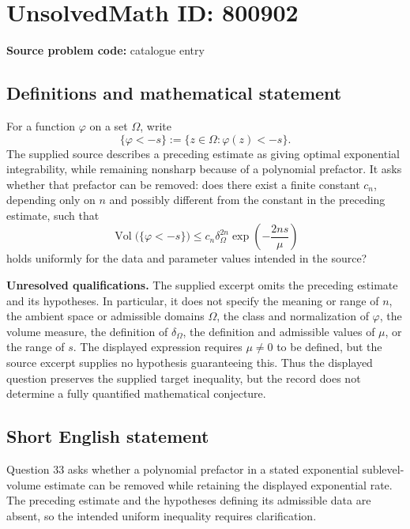 \documentclass[11pt]{article}
\begin{document}
\section*{UnsolvedMath ID: 800902}
\textbf{Source problem code:} catalogue entry
\subsection{Definitions and mathematical statement}
For a function \(\varphi\) on a set \(\Omega\), write
\[
\{\varphi<-s\}:=\{z\in\Omega:\varphi(z)<-s\}.
\]
The supplied source describes a preceding estimate as giving optimal exponential integrability, while remaining nonsharp because of a polynomial prefactor. It asks whether that prefactor can be removed: does there exist a finite constant \(c_n\), depending only on \(n\) and possibly different from the constant in the preceding estimate, such that
\[
\operatorname{Vol}\bigl(\{\varphi<-s\}\bigr)
\leq c_n\delta_{\Omega}^{2n}\exp\!\left(-\frac{2ns}{\mu}\right)
\]
holds uniformly for the data and parameter values intended in the source?

\textbf{Unresolved qualifications.} The supplied excerpt omits the preceding estimate and its hypotheses. In particular, it does not specify the meaning or range of \(n\), the ambient space or admissible domains \(\Omega\), the class and normalization of \(\varphi\), the volume measure, the definition of \(\delta_{\Omega}\), the definition and admissible values of \(\mu\), or the range of \(s\). The displayed expression requires \(\mu\neq0\) to be defined, but the source excerpt supplies no hypothesis guaranteeing this. Thus the displayed question preserves the supplied target inequality, but the record does not determine a fully quantified mathematical conjecture.
\subsection{Short English statement}
Question 33 asks whether a polynomial prefactor in a stated exponential sublevel-volume estimate can be removed while retaining the displayed exponential rate. The preceding estimate and the hypotheses defining its admissible data are absent, so the intended uniform inequality requires clarification.
\end{document}
